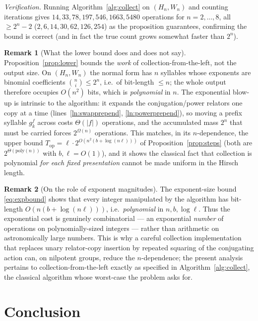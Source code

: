 \documentclass{amsart}
\theoremstyle{definition}
\newtheorem{remark}{Remark}
\begin{document}
\noindent\emph{Verification.} Running Algorithm~\ref{alg:collect} on $(H_n,W_n)$ and counting
iterations gives $14,33,78,197,546,1663,5480$ operations for $n=2,\dots,8$, all $\ge 2^n-2$
($2,6,14,30,62,126,254$) as the proposition guarantees, confirming the bound is correct (and
in fact the true count grows somewhat faster than $2^n$).

\begin{remark}[What the lower bound does and does not say]
Proposition~\ref{prop:lower} bounds the \emph{work} of collection-from-the-left, not the output
size. On $(H_n,W_n)$ the normal form has $n$ syllables whose exponents are binomial coefficients
$\binom{n}{i}\le 2^n$, i.e.\ of bit-length $\le n$; the whole output therefore occupies
$O(n^2)$ bits, which is \emph{polynomial} in $n$. The exponential blow-up is intrinsic to the
algorithm: it expands the conjugation/power relators one copy at a time
(lines~\ref{ln:swapprepend}, \ref{ln:powerprepend}), so moving a prefix syllable $g_k^f$ across
costs $\Theta(|f|)$ operations, and the accumulated mass $2^n$ that must be carried forces
$2^{\Omega(n)}$ operations. This matches, in its $n$-dependence, the upper bound
$T_{\mathrm{op}}=\ell\cdot 2^{O(n^2(b+\log(n\ell)))}$ of Proposition~\ref{prop:steps}
\textup{(}both are $2^{\Theta(\mathrm{poly}(n))}$ with $b,\ell=O(1)$\textup{)}, and it shows the
classical fact that collection is polynomial \emph{for each fixed presentation} cannot be made
uniform in the Hirsch length.
\end{remark}

\begin{remark}[On the role of exponent magnitudes]
The exponent-size bound \eqref{eq:expbound} shows that every integer manipulated by the
algorithm has bit-length $O(n(b+\log(n\ell)))$, i.e.\ \emph{polynomial} in $n,b,\log\ell$.
Thus the exponential cost is genuinely combinatorial — an exponential \emph{number} of
operations on polynomially-sized integers — rather than arithmetic on astronomically large
numbers. This is why a careful collection implementation that replaces unary relator-copy
insertion by repeated squaring of the conjugating action can, on nilpotent groups, reduce the
$n$-dependence; the present analysis pertains to collection-from-the-left exactly as specified
in Algorithm~\ref{alg:collect}, the classical algorithm whose worst-case the problem asks for.
\end{remark}

\section{Conclusion}
\end{document}
